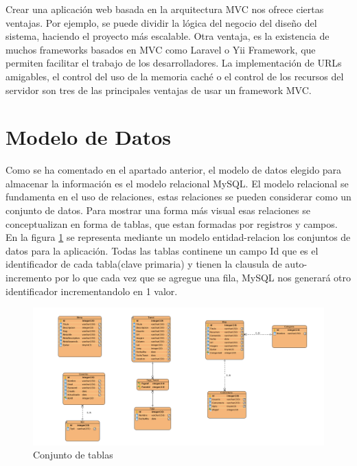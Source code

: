 Crear una aplicación web basada en la arquitectura MVC nos ofrece ciertas ventajas. Por ejemplo, se puede dividir la lógica del negocio del diseño del sistema, haciendo el proyecto más escalable. Otra ventaja, es la existencia  de muchos frameworks basados en MVC como Laravel o Yii Framework, que permiten facilitar el trabajo de los desarrolladores. La implementación de URLs amigables, el control del uso de la memoria caché o el control de los recursos del servidor son tres de las principales ventajas de usar un framework MVC.


\section{Modelo de Datos}

Como se ha comentado en el apartado anterior, el modelo de datos elegido para almacenar la información es el modelo relacional MySQL. El modelo relacional se fundamenta en el uso de relaciones, estas relaciones se pueden considerar como un conjunto de datos. Para mostrar una forma más visual esas relaciones se conceptualizan en forma de tablas, que estan formadas por registros y campos. En la figura \ref{tablas_bd} se representa mediante un modelo entidad-relacion los conjuntos de datos para la aplicación. Todas las tablas continene un campo Id que es el identificador de cada tabla(clave primaria) y tienen la clausula de auto-incremento por lo que cada vez que se agregue una fila, MySQL nos generará otro identificador incrementandolo en 1 valor.


\begin{figure}
\begin{center}
\includegraphics[width=1.0\textwidth]{imagenes/E-R.png}
\caption{Conjunto de tablas}
\label{tablas_bd}
\end{center}
\end{figure}

